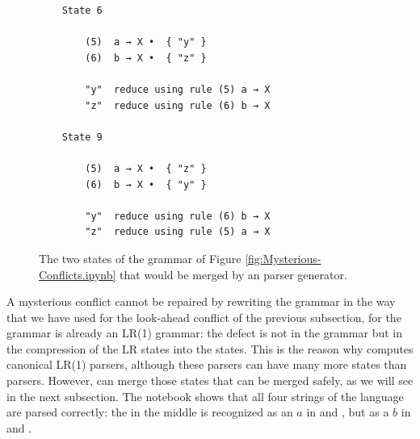 \begin{figure}[!ht]
\centering
\begin{verbatim}
    State 6

        (5)  a → X •  { "y" }
        (6)  b → X •  { "z" }

        "y"  reduce using rule (5) a → X
        "z"  reduce using rule (6) b → X

    State 9

        (5)  a → X •  { "z" }
        (6)  b → X •  { "y" }

        "y"  reduce using rule (6) b → X
        "z"  reduce using rule (5) a → X
\end{verbatim}
\vspace*{-0.3cm}
\caption{The two states of the grammar of Figure \ref{fig:Mysterious-Conflicts.ipynb} that would be merged
  by an  parser generator.}
\label{fig:Mysterious-Conflicts.states}
\end{figure}
\vspace*{0.3cm}

\remarkEng
A mysterious conflict cannot be repaired by rewriting the grammar in the way that we have used for the
look-ahead conflict of the previous subsection, for the grammar is already an LR(1) grammar: the defect is not
in the grammar but in the compression of the LR states into the  states.  This is the reason why
 computes canonical LR(1) parsers, although these parsers can have many more states than
 parsers.  However,  can merge those states that can be merged safely, as
we will see in the next subsection.  The notebook shows that all four strings of the language are parsed correctly: the
 in the middle is recognized as an $a$ in  and , but as a $b$ in
 and .
\eox

